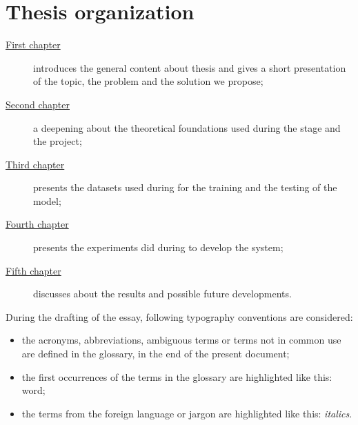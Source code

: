 \section{Thesis organization}\label{sec:thesis-organization}
\begin{description}
    \item[{\hyperref[ch:introduction]{First chapter}}] introduces the general content about thesis and gives a short presentation of the topic, the problem and the solution we propose;

    \item[{\hyperref[ch:background]{Second chapter}}] a deepening about the theoretical foundations used during the stage and the project;

    \item[{\hyperref[ch:methodology]{Third chapter}}] presents the datasets used during for the training and the testing of the model;

    \item[{\hyperref[ch:experimental-results]{Fourth chapter}}] presents the experiments did during to develop the system;

    \item[{\hyperref[ch:final-discussions]{Fifth chapter}}] discusses about the results and possible future developments.
\end{description}
During the drafting of the essay, following typography conventions are considered:
\begin{itemize}
    \item the acronyms, abbreviations, ambiguous terms or terms not in common use are defined in the glossary, in the end of the present document;
    \item the first occurrences of the terms in the glossary are highlighted like this: \gls{word};
    \item the terms from the foreign language or jargon are highlighted like this: \emph{italics}.
\end{itemize}